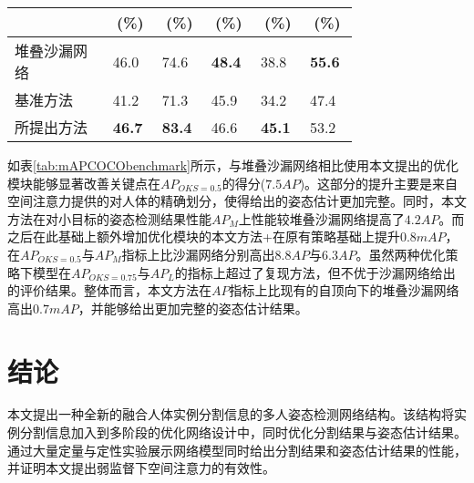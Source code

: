 \begin{outstandingabstract}
\begin{table}[H]
\begin{minipage}[t]{0.8\linewidth}
\begin{tabular}{p{0.25\linewidth}p{0.1\linewidth}<{\centering}p{0.1\linewidth}<{\centering}p{0.1\linewidth}<{\centering}p{0.1\linewidth}<{\centering}p{0.1\linewidth}<{\centering}}
    			& \multicolumn{1}{c}{(\%)}& \multicolumn{1}{c}{(\%)}&
    			\multicolumn{1}{c}{(\%)}& \multicolumn{1}{c}{(\%)}& \multicolumn{1}{c}{
    				(\%)}\\
    			\hline
    			堆叠沙漏网络\cite{newell2016stacked} & 46.0 & 74.6 & \textbf{48.4} & 38.8  & \textbf{55.6} \\
    			基准方法\cite{wei2016convolutional} & 41.2 & 71.3 & 45.9 & 34.2 & 47.4 \\
    			所提出方法 & \textbf{46.7} & \textbf{83.4} & 46.6 & \textbf{45.1} & 53.2 \\
    			\hline
    		\end{tabular}
    	\end{minipage}
    \end{table}

	如表\ref{tab:mAPCOCObenchmark}所示，与堆叠沙漏网络相比使用本文提出的优化模块能够显著改善关键点在$AP_{OKS=0.5}$的得分($7.5AP$)。这部分的提升主要是来自空间注意力提供的对人体的精确划分，使得给出的姿态估计更加完整。同时，本文方法在对小目标的姿态检测结果性能$AP_M$上性能较堆叠沙漏网络提高了$4.2AP$。而之后在此基础上额外增加优化模块的本文方法+在原有策略基础上提升$0.8mAP$，在$AP_{OKS=0.5}$与$AP_M$指标上比沙漏网络分别高出$8.8AP$与$6.3AP$。虽然两种优化策略下模型在$AP_{OKS=0.75}$与$AP_L$的指标上超过了复现方法，但不优于沙漏网络给出的评价结果。整体而言，本文方法在$AP$指标上比现有的自顶向下的堆叠沙漏网络高出$0.7mAP$，并能够给出更加完整的姿态估计结果。
	
	\section{结论}
	本文提出一种全新的融合人体实例分割信息的多人姿态检测网络结构。该结构将实例分割信息加入到多阶段的优化网络设计中，同时优化分割结果与姿态估计结果。通过大量定量与定性实验展示网络模型同时给出分割结果和姿态估计结果的性能，并证明本文提出弱监督下空间注意力的有效性。
	
    
\end{outstandingabstract}
